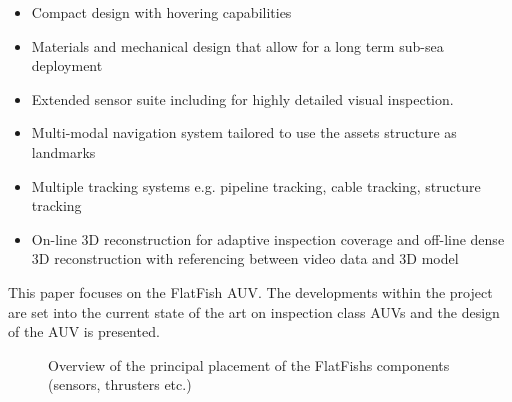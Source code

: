 \documentclass[conference]{IEEEtran}
\begin{document}
\begin{itemize}
    \item Compact design with hovering capabilities
    \item Materials and mechanical design that allow for a long term sub-sea deployment
    \item Extended sensor suite including for highly detailed visual inspection.
    \item Multi-modal navigation system tailored to use the assets structure as landmarks
    \item Multiple tracking systems e.g. pipeline tracking, cable tracking, structure
        tracking
    \item On-line 3D reconstruction for adaptive inspection coverage and off-line dense 3D
        reconstruction with referencing between video data and 3D model
\end{itemize}

This paper focuses on the FlatFish AUV. The developments within the project are set into
the current state of the art on inspection class AUVs and the design of the AUV is
presented.


\begin{figure}[!t]
	\begin{center}
		\centering
		\hfil
		\caption{Overview of the principal placement of the FlatFishs components (sensors, 
		thrusters etc.)}
		\label{fig:sensor_placement}
	\end{center}
\end{figure}
\end{document}
